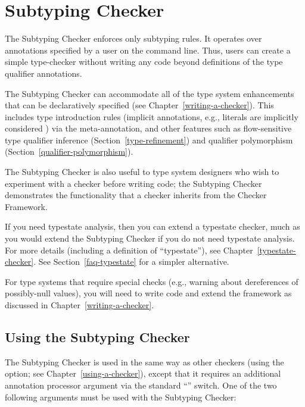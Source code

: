 \htmlhr
\chapter{Subtyping Checker\label{subtyping-checker}}

The Subtyping Checker enforces only subtyping rules.  It operates over
annotations specified by a user on the command line.  Thus, users can
create a simple type-checker without writing any code beyond definitions of
the type qualifier annotations.

The Subtyping Checker can accommodate all of the type system enhancements that
can be declaratively specified (see Chapter~\ref{writing-a-checker}).
This includes type introduction rules (implicit
annotations, e.g., literals are implicitly considered ) via
the  meta-annotation, and other features such as
flow-sensitive type qualifier inference (Section~\ref{type-refinement}) and
qualifier polymorphism (Section~\ref{qualifier-polymorphism}).

The Subtyping Checker is also useful to type system designers who wish to
experiment with a checker before writing code; the Subtyping Checker
demonstrates the functionality that a checker inherits from the Checker
Framework.

If you need typestate analysis, then you can extend a typestate checker,
much as you would extend the Subtyping Checker if you do not need typestate
analysis.  For more details (including a definition of ``typestate''), see
Chapter~\ref{typestate-checker}.
See Section~\ref{faq-typestate} for a simpler alternative.

For type systems that require special checks (e.g., warning about
dereferences of possibly-null values), you will need to write code and
extend the framework as discussed in Chapter~\ref{writing-a-checker}.


\section{Using the Subtyping Checker\label{subtyping-using}}

\begin{sloppypar}
The Subtyping Checker is used in the same way as other checkers (using the
 option; see Chapter~\ref{using-a-checker}), except that it
requires an additional annotation processor argument via the standard
``'' switch. One of the two following arguments must be used with the
Subtyping Checker:
\end{sloppypar}

